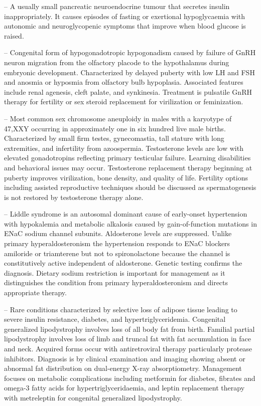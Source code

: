 -- A usually small pancreatic neuroendocrine tumour that secretes insulin inappropriately. It causes episodes of fasting or exertional hypoglycaemia with autonomic and neuroglycopenic symptoms that improve when blood glucose is raised.

-- Congenital form of hypogonadotropic hypogonadism caused by failure of GnRH neuron migration from the olfactory placode to the hypothalamus during embryonic development. Characterized by delayed puberty with low LH and FSH and anosmia or hyposmia from olfactory bulb hypoplasia. Associated features include renal agenesis, cleft palate, and synkinesia. Treatment is pulsatile GnRH therapy for fertility or sex steroid replacement for virilization or feminization.

-- Most common sex chromosome aneuploidy in males with a karyotype of 47,XXY occurring in approximately one in six hundred live male births. Characterized by small firm testes, gynecomastia, tall stature with long extremities, and infertility from azoospermia. Testosterone levels are low with elevated gonadotropins reflecting primary testicular failure. Learning disabilities and behavioral issues may occur. Testosterone replacement therapy beginning at puberty improves virilization, bone density, and quality of life. Fertility options including assisted reproductive techniques should be discussed as spermatogenesis is not restored by testosterone therapy alone.

-- Liddle syndrome is an autosomal dominant cause of early-onset hypertension with hypokalemia and metabolic alkalosis caused by gain-of-function mutations in ENaC sodium channel subunits. Aldosterone levels are suppressed. Unlike primary hyperaldosteronism the hypertension responds to ENaC blockers amiloride or triamterene but not to spironolactone because the channel is constitutively active independent of aldosterone. Genetic testing confirms the diagnosis. Dietary sodium restriction is important for management as it distinguishes the condition from primary hyperaldosteronism and directs appropriate therapy.

-- Rare conditions characterized by selective loss of adipose tissue leading to severe insulin resistance, diabetes, and hypertriglyceridemia. Congenital generalized lipodystrophy involves loss of all body fat from birth. Familial partial lipodystrophy involves loss of limb and truncal fat with fat accumulation in face and neck. Acquired forms occur with antiretroviral therapy particularly protease inhibitors. Diagnosis is by clinical examination and imaging showing absent or abnormal fat distribution on dual-energy X-ray absorptiometry. Management focuses on metabolic complications including metformin for diabetes, fibrates and omega-3 fatty acids for hypertriglyceridaemia, and leptin replacement therapy with metreleptin for congenital generalized lipodystrophy.

